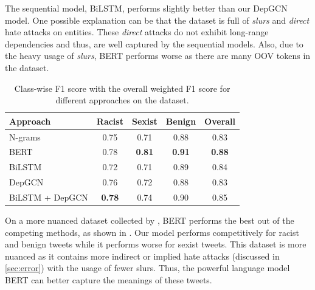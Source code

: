 The sequential model, BiLSTM, performs slightly better than our DepGCN model. One possible explanation can be that the \citet{davidson2017automated} dataset is full of \emph{slurs} and \emph{direct} hate attacks on entities. These \emph{direct} attacks do not exhibit long-range dependencies and thus, are well captured by the sequential models. Also, due to the heavy usage of \emph{slurs}, BERT performs worse as there are many OOV tokens in the dataset.

\begin{table}[tbh]
  \centering
  \small
  \setlength{\tabcolsep}{2pt}
\begin{tabular}{ l | c c  c c}
\toprule %
 Approach &  Racist & Sexist & Benign & Overall \\ %
  \midrule
 N-grams & 0.75 & 0.71 & 0.88 & 0.83 \\
 BERT & 0.78 & \textbf{0.81} & \textbf{0.91} & \textbf{0.88} \\
BiLSTM & 0.72 & 0.71 & 0.89 & 0.84 \\
DepGCN & 0.76 & 0.72 & 0.88 & 0.83 \\
BiLSTM + DepGCN & \textbf{0.78} & 0.74 & 0.90 & 0.85 \\
 \bottomrule %
\end{tabular}
\caption{\label{tab:waseem} Class-wise F1 score with the overall weighted F1 score for different approaches on the \citet{waseem-hovy-2016} dataset.}
\end{table}

On a more nuanced dataset collected by \citet{waseem-hovy-2016}, BERT performs the best out of the competing methods, as shown in . Our model performs competitively for racist and benign tweets while it performs worse for sexist tweets. This dataset is more nuanced as it contains more indirect or implied hate attacks (discussed in \cref{sec:error}) with the usage of fewer slurs. Thus, the powerful language model BERT can better capture the meanings of these tweets.

